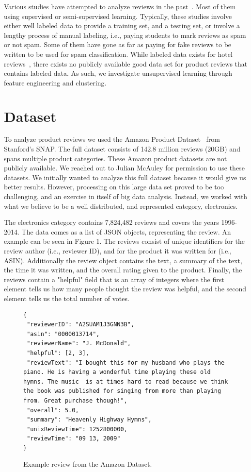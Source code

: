 \documentclass[journal, a4paper]{IEEEtran}
\begin{document}
Various studies have attempted to analyze reviews in the past~\cite{4}. Most of them using supervised or semi-supervised learning. Typically, these studies involve either well labeled data to provide a training set, and a testing set, or involve a lengthy process of manual labeling, i.e., paying students to mark reviews as spam or not spam. Some of them have gone as far as paying for fake reviews to be written to be used for spam classification. While labeled data exists for hotel reviews~\cite{10}, there exists no publicly available good data set for product reviews that contains labeled data. As such, we investigate unsupervised learning through feature engineering and clustering.


\section{Dataset}
To analyze product reviews we used the Amazon Product Dataset~\cite{1} from Stanford's SNAP. The full dataset consists of 142.8 million reviews (20GB) and spans multiple product categories. These Amazon product datasets are not publicly available. We reached out to Julian McAuley for permission to use these datasets. We initially wanted to analyze this full dataset because it would give us better results. However, processing on this large data set proved to be too challenging, and an exercise in itself of big data analysis. Instead, we worked with what we believe to be a well distributed, and represented category, electronics.

The electronics category contains 7,824,482 reviews and covers the years 1996-2014. The data comes as a list of JSON objects, representing the review. An example can be seen in Figure 1. The reviews consist of unique identifiers for the review author (i.e., reviewer ID), and for the product it was written for (i.e., ASIN). Additionally the review object contains the text, a summary of the text, the time it was written, and the overall rating given to the product. Finally, the reviews contain a "helpful" field that is an array of integers where the first element tells us how many people thought the review was helpful, and the second element tells us the total number of votes.

\begin{figure}[!hbt]
\begin{verbatim}
{
 "reviewerID": "A2SUAM1J3GNN3B",
 "asin": "0000013714",
 "reviewerName": "J. McDonald",
 "helpful": [2, 3],
 "reviewText": "I bought this for my husband who plays the piano. He is having a wonderful time playing these old hymns. The music  is at times hard to read because we think the book was published for singing from more than playing from. Great purchase though!",
 "overall": 5.0,
 "summary": "Heavenly Highway Hymns",
 "unixReviewTime": 1252800000,
 "reviewTime": "09 13, 2009"
}
\end{verbatim}
\caption{Example review from the Amazon Dataset.}
\end{figure}
\end{document}
